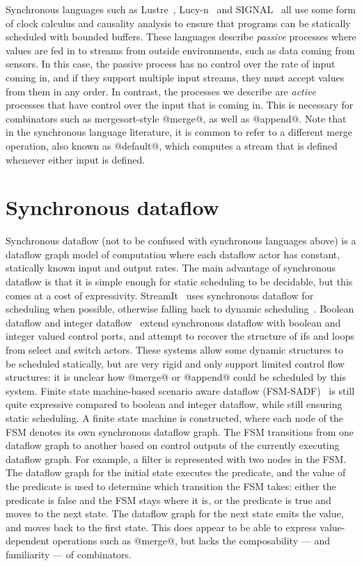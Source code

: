 Synchronous languages such as {\sc Lustre}~\cite{halbwachs1991synchronous}, Lucy-n~\cite{mandel2010lucy} and SIGNAL~\cite{le2003polychrony} all use some form of clock calculus and causality analysis to ensure that programs can be statically scheduled with bounded buffers.
These languages describe \emph{passive} processes where values are fed in to streams from outside environments, such as data coming from sensors.
In this case, the passive process has no control over the rate of input coming in, and if they support multiple input streams, they must accept values from them in any order.
In contrast, the processes we describe are \emph{active} processes that have control over the input that is coming in.
This is necessary for combinators such as mergesort-style @merge@, as well as @append@.
Note that in the synchronous language literature, it is common to refer to a different merge operation, also known as @default@, which computes a stream that is defined whenever either input is defined.

\section{Synchronous dataflow}
\label{related/synchronous-dataflow}

Synchronous dataflow (not to be confused with synchronous languages above) is a dataflow graph model of computation where each dataflow actor has constant, statically known input and output rates.
The main advantage of synchronous dataflow is that it is simple enough for static scheduling to be decidable, but this comes at a cost of expressivity.
StreamIt~\cite{thies2002streamit} uses synchronous dataflow for scheduling when possible, otherwise falling back to dynamic scheduling~\cite{soule2013dynamic}.
Boolean dataflow and integer dataflow~\cite{buck1993scheduling,buck1994static} extend synchronous dataflow with boolean and integer valued control ports, and attempt to recover the structure of ifs and loops from select and switch actors.
These systems allow some dynamic structures to be scheduled statically, but are very rigid and only support limited control flow structures: it is unclear how @merge@ or @append@ could be scheduled by this system.
Finite state machine-based scenario aware dataflow (FSM-SADF)~\cite{stuijk2011scenario,van2015scenario} is still quite expressive compared to boolean and integer dataflow, while still ensuring static scheduling.
A finite state machine is constructed, where each node of the FSM denotes its own synchronous dataflow graph.
The FSM transitions from one dataflow graph to another based on control outputs of the currently executing dataflow graph.
For example, a filter is represented with two nodes in the FSM.
The dataflow graph for the initial state executes the predicate, and the value of the predicate is used to determine which transition the FSM takes: either the predicate is false and the FSM stays where it is, or the predicate is true and moves to the next state.
The dataflow graph for the next state emits the value, and moves back to the first state.
This does appear to be able to express value-dependent operations such as @merge@, but lacks the composability --- and familiarity --- of combinators.


